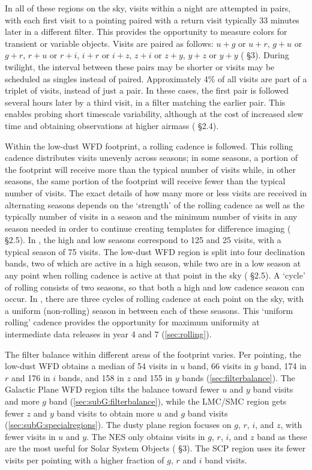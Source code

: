 In all of these regions on the sky, visits within a night are attempted in pairs, with each first visit to a pointing paired with a return visit typically 33 minutes later in a different filter. This provides the opportunity to measure colors for transient or variable objects. Visits are paired as follows: $u+g$ or $u+r$, $g+u$ or $g+r$, $r+u$ or $r+i$, $i+r$ or $i+z$, $z+i$ or $z+y$, $y+z$ or $y+y$ ( \S3).  During twilight, the interval between these pairs may be shorter or visits may be scheduled as singles instead of paired. Approximately 4\% of all visits are part of a triplet of visits, instead of just a pair. In these cases, the first pair is followed several hours later by a third visit, in a filter matching the earlier pair. This enables probing short timescale variability, although at the cost of increased slew time and obtaining observations at higher airmass ( \S2.4). 

Within the low-dust WFD footprint, a rolling cadence is followed. This rolling cadence distributes visits unevenly across seasons; in some seasons, a portion of the footprint will receive more than the typical number of visits while, in other seasons, the same portion of the footprint will receive fewer than the typical number of visits. The exact details of how many more or less visits are received in alternating seasons depends on the `strength' of the rolling cadence as well as the typically number of visits in a season and the minimum number of visits in any season needed in order to continue creating templates for difference imaging ( \S2.5). In , the high and low seasons correspond to 125 and 25 visits, with a typical season of 75 visits. The low-dust WFD region is split into four declination bands, two of which are active in a high season, while two are in a low season at any point when rolling cadence is active at that point in the sky ( \S2.5). A `cycle' of rolling consists of two seasons, so that both a high and low cadence season can occur. In , there are three cycles of rolling cadence at each point on the sky, with a uniform (non-rolling) season in between each of these seasons. This `uniform rolling' cadence provides the opportunity for maximum uniformity at intermediate data releases in year 4 and 7 (\autoref{sec:rolling}). 

The filter balance within different areas of the footprint varies. Per pointing, the low-dust WFD obtains a median of 54 visits in $u$ band, 66 visits in $g$ band, 174 in $r$ and 176 in $i$ bands, and 158 in $z$ and 155 in $y$ bands (\autoref{sec:filterbalance}). The Galactic Plane WFD region tilts the balance toward fewer $u$ and $y$ band visits and more $g$ band (\autoref{sec:subG:filterbalance}), while the LMC/SMC region gets fewer $z$ and $y$ band visits to obtain more $u$ and $g$ band visits (\autoref{sec:subG:specialregions}). The dusty plane region focuses on $g$, $r$, $i$, and $z$, with fewer visits in $u$ and $y$. The NES only obtains visits in $g$, $r$, $i$, and $z$ band as these are the most useful for Solar System Objects ( \S3). The SCP region uses its fewer visits per pointing with a higher fraction of $g$, $r$ and $i$ band visits.

